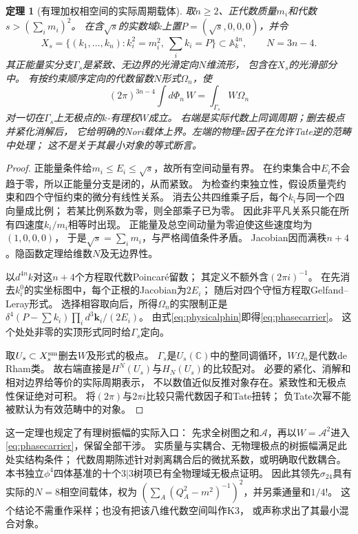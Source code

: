 \documentclass[11pt,a4paper]{ctexart}
\theoremstyle{cnplain}\newtheorem{theorem}{定理}[section]
\theoremstyle{definition}\newtheorem{definition}[theorem]{定义}
\theoremstyle{remark}\newtheorem{remark}[theorem]{注}
\begin{document}
\begin{theorem}[有理加权相空间的实际周期载体]\label{thm:actualphase}
取$n\ge2$、正代数质量$m_i$和代数$s>(\sum_i m_i)^2$。
在含$\sqrt s$的实数域$k$上置$P=(\sqrt s,0,0,0)$，并令
\[
 X_s=\{(k_1,\ldots,k_n): k_i^2=m_i^2,\ \sum_i k_i=P\}
       \subset\mathbb A_k^{4n},\qquad N=3n-4.
\]
其正能量实分支$\Gamma_s$是紧致、无边界的光滑定向$N$维流形，
包含在$X_s$的光滑部分中。
有按约束顺序定向的代数留数$N$形式$\Omega_n$，使
\begin{equation}\label{eq:phasecarrier}
 (2\pi)^{3n-4}\int d\Phi_n\,W
       =\int_{\Gamma_s}W\Omega_n
\end{equation}
对一切在$\Gamma_s$上无极点的$k$-有理权$W$成立。
右端是实际代数上同调周期；删去极点并紧化消解后，
它给明确的Nori载体上界。左端的物理$\pi$因子在允许Tate逆的范畴中处理；
这不是关于其最小对象的等式断言。
\end{theorem}
\begin{proof}
正能量条件给$m_i\le E_i\le\sqrt s$，故所有空间动量有界。
在约束集合中$E_i$不会趋于零，所以正能量分支是闭的，从而紧致。
为检查约束独立性，假设质量壳约束和四个守恒约束的微分有线性关系。
消去公共四维乘子后，每个$k_i$与同一个四向量成比例；
若某比例系数为零，则全部乘子已为零。
因此非平凡关系只能在所有四速度$k_i/m_i$相等时出现。
正能量及总空间动量为零迫使这些速度均为$(1,0,0,0)$，
于是$\sqrt s=\sum_i m_i$，与严格阈值条件矛盾。
Jacobian因而满秩$n+4$。隐函数定理给维数$N$及无边界性。

以$d^{4n}k$对这$n+4$个方程取代数Poincaré留数；
其定义不额外含$(2\pi i)^{-1}$。
在先消去$k_i^0$的实坐标图中，每个正根的Jacobian为$2E_i$；
随后对四个守恒方程取Gelfand--Leray形式。
选择相容取向后，所得$\Omega_n$的实限制正是
$\delta^4(P-\sum k_i)\prod_i d^3\mathbf k_i/(2E_i)$。
由式\eqref{eq:physicalphin}即得\eqref{eq:phasecarrier}。
这个处处非零的实顶形式同时给$\Gamma_s$定向。

取$U_s\subset X_s^{\rm sm}$删去$W$及形式的极点。
$\Gamma_s$是$U_s(\mathbb C)$中的整同调循环，$W\Omega_n$是代数de Rham类。
故右端直接是$H^N(U_s)$与$H_N(U_s)$的比较配对。
必要的紧化、消解和相对边界给等价的实际周期表示，
不以数值近似反推对象存在。紧致性和无极点性保证绝对可积。
将$(2\pi)$与$2\pi i$比较只需代数因子和Tate扭转；
负Tate次幂不能被默认为有效范畴中的对象。
\end{proof}

这一定理也规定了有理树振幅的实际入口：
先求全树图之和$\mathcal A$，再以$W=\mathcal A^2$进入
\eqref{eq:phasecarrier}，保留全部干涉。
实质量与实耦合、无物理极点的树振幅满足此处实结构条件；
代数周期陈述针对剥离耦合后的微扰系数，或明确取代数耦合。
本书独立$\phi^4$四体基准的十个$3|3$树项已有全物理域无极点证明。
因此其领先$\sigma_{24}$具有实际的$N=8$相空间载体，权为
$(\sum_A(Q_A^2-m^2)^{-1})^2$，并另乘通量和$1/4!$。
这个结论不需重作采样；也没有把该八维代数空间叫作K3，
或声称求出了其最小混合对象。
\end{document}
